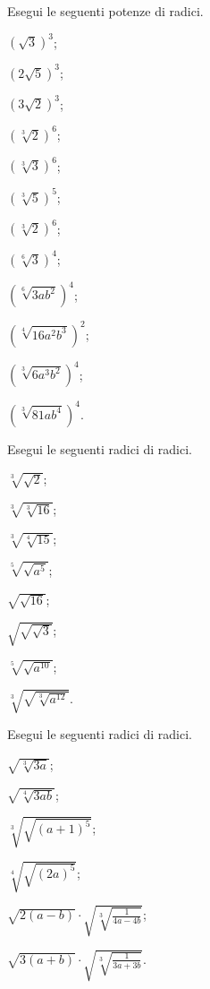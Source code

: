 \begin{esercizio}[\Ast]
 \label{ese:2.60}
Esegui le seguenti potenze di radici.
 \begin{multicols}{4}
 \begin{enumeratea}
 \item $\left(\sqrt 3\right)^3$;
 \item $\left(2\sqrt 5\right)^3$;
 \item $\left(3\sqrt 2\right)^3$;
 \item $\left(\sqrt[3]2\right)^6$;
 \item $\left(\sqrt[3]3\right)^6$;
 \item $\left(\sqrt[3]5\right)^5$;
 \item $\left(\sqrt[3]2\right)^6$;
 \item $\left(\sqrt[6]3\right)^4$;
 \item $\left(\sqrt[6]{3ab^2}\right)^4$;
 \item $\left(\sqrt[4]{16a^2b^3}\right)^2$;
 \item $\left(\sqrt[3]{6a^3b^2}\right)^4$;
 \item $\left(\sqrt[3]{81ab^4}\right)^4$.
 \end{enumeratea}
 \end{multicols}
\end{esercizio}
\pagebreak
\begin{esercizio}[\Ast]
 \label{ese:2.61}
Esegui le seguenti radici di radici.
 \begin{multicols}{4}
 \begin{enumeratea}
 \item $\sqrt[3]{\sqrt 2}$;
 \item $\sqrt[3]{\sqrt[3]{16}}$;
 \item $\sqrt[3]{\sqrt[4]{15}}$;
 \item $\sqrt[5]{\sqrt{a^5}}$;
 \item $\sqrt{\sqrt{16}}$;
 \item $\sqrt{\sqrt{\sqrt 3}}$;
 \item $\sqrt[5]{\sqrt{a^{10}}}$;
 \item $\sqrt[3]{\sqrt{\sqrt[3]{a^{12}}}}$.
 \end{enumeratea}
 \end{multicols}
\end{esercizio}

\begin{esercizio}[\Ast]
 \label{ese:2.62}
Esegui le seguenti radici di radici.
\begin{multicols}{2}
 \begin{enumeratea}
 \item $\sqrt{\sqrt[3]{3a}}$;
 \item $\sqrt{\sqrt[4]{3ab}}$;
 \item $\sqrt[3]{\sqrt{(a+1)^5}}$;
 \item $\sqrt[4]{\sqrt{(2a)^5}}$;
 \item $\sqrt{2(a-b)}\cdot \sqrt{\sqrt[3]{\frac 1{4a-4b}}}$;
 \item $\sqrt{3(a+b)}\cdot \sqrt{\sqrt[3]{\frac 1{3a+3b}}}$.
 \end{enumeratea}
 \end{multicols}
\end{esercizio}

